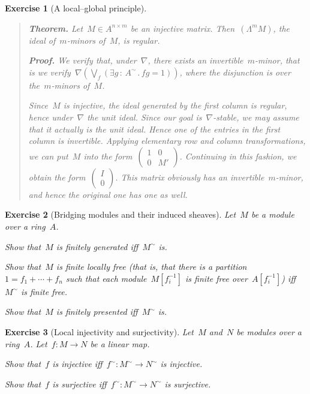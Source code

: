 \documentclass{ws-rv9x6}
\newtheorem{ex}{Exercise}
\newenvironment{exercise}[1]{
  \begin{ex}[#1]
}{\end{ex}}
\renewcommand{\_}{\mathpunct{.}}
\newcommand{\?}{\,{:}\,}
\begin{document}
\begin{exercise}{A local--global principle}
\begin{alphlist}[(f)]
\begin{quote}
\textbf{Theorem.} Let~$M \in A^{n \times m}$ be an injective matrix.
Then~$(\Lambda^m M)$, the ideal of~$m$-minors of~$M$, is regular.

\textbf{Proof.} We verify that, under~$\nabla$, there exists an
invertible~$m$-minor, that is we verify~$\nabla(\bigvee_f (\exists g\?A^\sim\_
fg=1))$, where the disjunction is over the~$m$-minors of~$M$.

Since~$M$ is injective, the ideal generated by the first column is regular,
hence under~$\nabla$ the unit ideal. Since our goal is~$\nabla$-stable, we may assume
that it actually is the unit ideal. Hence one of the entries in the first
column is invertible. Applying elementary row and column transformations, we
can put~$M$ into the
form~$\left(\begin{smallmatrix}1&0\\0&M'\end{smallmatrix}\right)$. Continuing
in this fashion, we obtain the
form~$\left(\begin{smallmatrix}I\\0\end{smallmatrix}\right)$. This matrix
obviously has an invertible~$m$-minor, and hence the original one has one as
well.
\end{quote}
\end{alphlist}
\end{exercise}

\begin{exercise}{Bridging modules and their induced sheaves}%
\label{ex:bridging-modules}%
Let~$M$ be a module over a ring~$A$.
\begin{alphlist}[(c)]
\item Show that~$M$ is finitely generated iff~$M^\sim$ is.
\item Show that~$M$ is finite locally free (that is, that there is a
partition~$1 = f_1 + \cdots + f_n$ such that each module~$M[f_i^{-1}]$ is
finite free over~$A[f_i^{-1}]$) iff~$M^\sim$ is finite free.
\item Show that~$M$ is finitely presented iff~$M^\sim$ is.
\end{alphlist}
\end{exercise}

\begin{exercise}{Local injectivity and surjectivity}%
Let~$M$ and~$N$ be modules over a ring~$A$. Let~$f : M \to N$ be a linear map.
\begin{alphlist}[(b)]
\item Show that~$f$ is injective iff~$f^\sim : M^\sim \to N^\sim$ is injective.
\item Show that~$f$ is surjective iff~$f^\sim : M^\sim \to N^\sim$ is surjective.
\end{alphlist}
\end{exercise}
\end{document}
